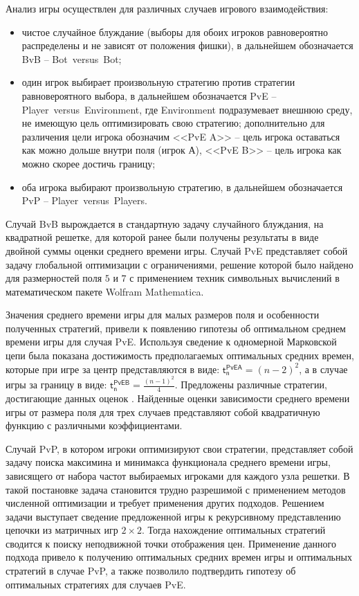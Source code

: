 Анализ игры осуществлен для различных случаев игрового взаимодействия: 
\begin{itemize}
    \item чистое случайное блуждание (выборы для обоих игроков равновероятно распределены и не зависят от положения фишки), в дальнейшем обозначается BvB -- Bot~versus~Bot;
    \item один игрок выбирает произвольную стратегию против стратегии равновероятного выбора, в дальнейшем обозначается PvE -- Player~versus~Environment, где Environment подразумевает внешнюю среду, не имеющую цель оптимизировать свою стратегию; дополнительно для различения цели игрока обозначим <<PvE A>> -- цель игрока оставаться как можно дольше внутри поля (игрок А), <<PvE B>> -- цель игрока как можно скорее достичь границу;
    \item оба игрока выбирают произвольную стратегию, в дальнейшем обозначается PvP -- Player~versus~Players.
\end{itemize}
Случай BvB вырождается в стандартную задачу случайного блуждания, на квадратной решетке, для которой ранее были получены результаты в виде двойной суммы оценки среднего времени игры. Случай PvE представляет собой задачу глобальной оптимизации с ограничениями, решение которой было найдено для размерностей поля $5$ и $7$ с применением техник символьных вычислений в математическом пакете Wolfram Mathematica. 

Значения среднего времени игры для малых размеров поля и особенности полученных стратегий, привели к появлению гипотезы об оптимальном среднем времени игры для случая PvE. Используя сведение к одномерной Марковской цепи была показана достижимость предполагаемых оптимальных средних времен, которые при игре за центр представляются в виде: $\boldsymbol{\mathsf{t_n^{PvE A}}} = (n-2)^2$, а в случае игры за границу в виде: $\boldsymbol{\mathsf{t_n^{PvE B}}} = \frac{(n-1)^2}{4}$. Предложены различные стратегии, достигающие данных оценок \cite{confbib1}. Найденные оценки зависимости среднего времени игры от размера поля для трех случаев представляют собой квадратичную функцию с различными коэффициентами.

Случай PvP, в котором игроки оптимизируют свои стратегии, представляет собой задачу поиска максимина и минимакса функционала среднего времени игры, зависящего от набора частот выбираемых игроками для каждого узла решетки. В такой постановке задача становится трудно разрешимой с применением методов численной оптимизации и требует применения других подходов. Решением задачи выступает сведение предложенной игры к рекурсивному представлению цепочки из матричных игр $2 \times 2$. Тогда нахождение оптимальных стратегий сводится к поиску неподвижной точки отображения цен. Применение данного подхода привело к получению оптимальных средних времен игры и оптимальных стратегий в случае PvP, а также позволило подтвердить гипотезу об оптимальных стратегиях для случаев PvE.

